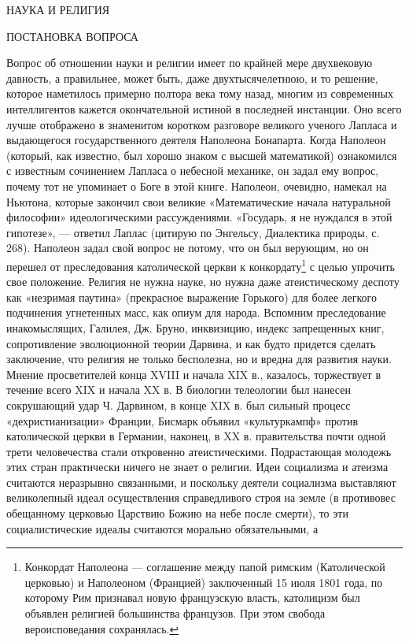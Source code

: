 НАУКА И РЕЛИГИЯ

ПОСТАНОВКА ВОПРОСА

Вопрос об отношении науки и религии имеет по крайней мере двухвековую давность,
а правильнее, может быть, даже двухтысячелетнюю, и то решение, которое
наметилось примерно полтора века тому назад, многим из современных
интеллигентов кажется окончательной истиной в последней инстанции. Оно всего
лучше отображено в знаменитом коротком разговоре великого ученого Лапласа и
выдающегося государственного деятеля Наполеона Бонапарта. Когда Наполеон
(который, как известно, был хорошо знаком с высшей математикой) ознакомился с
известным сочинением Лапласа о небесной механике, он задал ему вопрос, почему
тот не упоминает о Боге в этой книге. Наполеон, очевидно, намекал на Ньютона,
которые закончил свои великие «Математические начала натуральной философии»
идеологическими рассуждениями. «Государь, я не нуждался в этой гипотезе», ---
ответил Лаплас (цитирую по Энгельсу, Диалектика природы, с. 268). Наполеон
задал свой вопрос не потому, что он был верующим, но он перешел от
преследования католической церкви к конкордату\footnote{Конкордат Наполеона ---
соглашение между папой римским (Католической церковью) и Наполеоном
(Францией) заключенный 15 июля 1801 года, по которому Рим признавал
новую французскую власть, католицизм был объявлен религией большинства
французов. При этом свобода вероисповедания сохранялась.} с целью упрочить свое
положение.  Религия не нужна науке, но нужна даже атеистическому деспоту как
«незримая паутина» (прекрасное выражение Горького) для более легкого подчинения
угнетенных масс, как опиум для народа. Вспомним преследование инакомыслящих,
Галилея, Дж. Бруно, инквизицию, индекс запрещенных книг, сопротивление
эволюционной теории Дарвина, и как будто придется сделать заключение, что
религия не только бесполезна, но и вредна для развития науки. Мнение
просветителей конца XVIII и начала XIX в., казалось, торжествует в течение
всего XIX и начала XX в. В биологии телеологии был нанесен сокрушающий удар Ч.
Дарвином, в конце XIX в. был сильный процесс «дехристианизации» Франции,
Бисмарк объявил «культуркампф» против католической церкви в Германии, наконец,
в XX в. правительства почти одной трети человечества стали откровенно
атеистическими. Подрастающая молодежь этих стран практически ничего не знает о
религии. Идеи социализма и атеизма считаются неразрывно связанными, и поскольку
деятели социализма выставляют великолепный идеал осуществления справедливого
строя на земле (в противовес обещанному церковью Царствию Божию на небе после
смерти), то эти социалистические идеалы считаются морально обязательными, а
